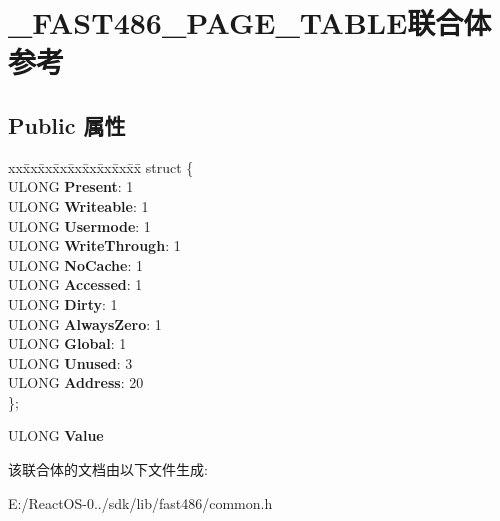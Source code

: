 \hypertarget{union___f_a_s_t486___p_a_g_e___t_a_b_l_e}{}\section{\+\_\+\+F\+A\+S\+T486\+\_\+\+P\+A\+G\+E\+\_\+\+T\+A\+B\+L\+E联合体 参考}
\label{union___f_a_s_t486___p_a_g_e___t_a_b_l_e}
\subsection*{Public 属性}
\begin{DoxyCompactItemize}
\item 
\mbox{\label{union___f_a_s_t486___p_a_g_e___t_a_b_l_e_aa609745ab510fab3ab7bfa7f12da1486}} 
\begin{tabbing}
xx\=xx\=xx\=xx\=xx\=xx\=xx\=xx\=xx\=\kill
struct \{\\
\>ULONG {\bfseries Present}: 1\\
\>ULONG {\bfseries Writeable}: 1\\
\>ULONG {\bfseries Usermode}: 1\\
\>ULONG {\bfseries WriteThrough}: 1\\
\>ULONG {\bfseries NoCache}: 1\\
\>ULONG {\bfseries Accessed}: 1\\
\>ULONG {\bfseries Dirty}: 1\\
\>ULONG {\bfseries AlwaysZero}: 1\\
\>ULONG {\bfseries Global}: 1\\
\>ULONG {\bfseries Unused}: 3\\
\>ULONG {\bfseries Address}: 20\\
\}; \\

\end{tabbing}\item 
\mbox{\label{union___f_a_s_t486___p_a_g_e___t_a_b_l_e_ab8c00aed3dc3c342fb418e94eb201444}} 
U\+L\+O\+NG {\bfseries Value}
\end{DoxyCompactItemize}


该联合体的文档由以下文件生成\+:\begin{DoxyCompactItemize}
\item 
E\+:/\+React\+O\+S-\/0../sdk/lib/fast486/common.\+h\end{DoxyCompactItemize}
